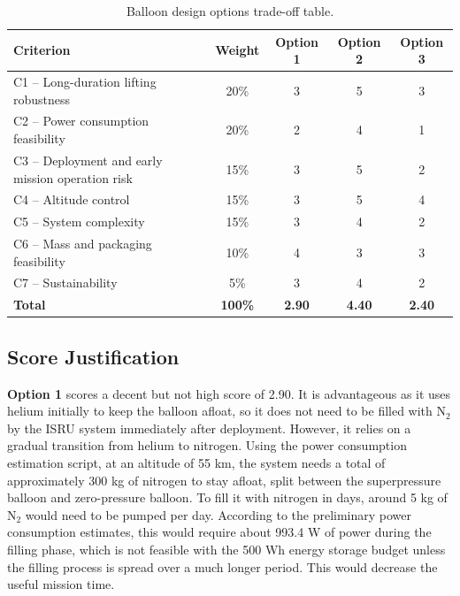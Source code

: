\begin{table}[H]
\centering
\caption{Balloon design options trade-off table.}
\label{tab:balloon_tradeoff_table}
\footnotesize
\renewcommand{\arraystretch}{1.12}
\setlength{\tabcolsep}{5pt}
\begin{tabularx}{\textwidth}{@{}X c c c c@{}}
\toprule
\textbf{Criterion} & \textbf{Weight} & \textbf{Option 1} & \textbf{Option 2} & \textbf{Option 3} \\
\midrule
C1 -- Long-duration lifting robustness 
& 20\% 
& \cellcolor{scorethree}3 
& \cellcolor{scorefive}5 
& \cellcolor{scorethree}3 \\

C2 -- Power consumption feasibility 
& 20\% 
& \cellcolor{scoretwo}2 
& \cellcolor{scorefour}4 
& \cellcolor{scoreone}1 \\

C3 -- Deployment and early mission operation risk 
& 15\%  
& \cellcolor{scorethree}3 
& \cellcolor{scorefive}5 
& \cellcolor{scoretwo}2 \\

C4 -- Altitude control 
& 15\%  
& \cellcolor{scorethree}3 
& \cellcolor{scorefive}5 
& \cellcolor{scorefour}4 \\

C5 -- System complexity 
& 15\%  
& \cellcolor{scorethree}3 
& \cellcolor{scorefour}4 
& \cellcolor{scoretwo}2 \\

C6 -- Mass and packaging feasibility 
& 10\% 
& \cellcolor{scorefour}4 
& \cellcolor{scorethree}3 
& \cellcolor{scorethree}3 \\

C7 -- Sustainability 
& 5\%  
& \cellcolor{scorethree}3 
& \cellcolor{scorefour}4 
& \cellcolor{scoretwo}2 \\
\midrule
\textbf{Total} 
& \textbf{100\%} 
& \textbf{2.90} 
& \textbf{4.40} 
& \textbf{2.40} \\
\bottomrule
\end{tabularx}
\end{table}

\subsection{Score Justification}
\label{subsec:balloon_score_justification}

\textbf{Option 1} scores a decent but not high score of 2.90. It is advantageous as it uses helium initially to keep the balloon afloat, so it does not need to be filled with N$_2$ by the ISRU system immediately after deployment. However, it relies on a gradual transition from helium to nitrogen. Using the power consumption estimation script, at an altitude of 55 km, the system needs a total of approximately 300 kg of nitrogen to stay afloat, split between the superpressure balloon and zero-pressure balloon. To fill it with nitrogen in days, around 5 kg of N$_2$ would need to be pumped per day. According to the preliminary power consumption estimates, this would require about 993.4 W of power during the filling phase, which is not feasible with the 500 Wh energy storage budget unless the filling process is spread over a much longer period. This would decrease the useful mission time.

